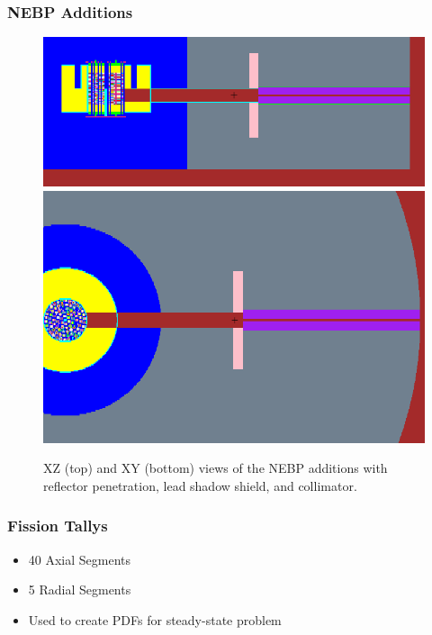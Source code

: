 \documentclass[fleqn]{beamer}
\begin{document}
\begin{frame}
\frametitle{NEBP Additions}

\begin{figure}
\centering
\includegraphics[trim=0 40 0 20, clip, width = .9\textwidth]{mcnp_newxz}\\
\includegraphics[trim=0 120 0 120, clip, width = .9\textwidth]{mcnp_newxy}
\caption{XZ (top) and XY (bottom) views of the NEBP additions with reflector penetration, lead shadow shield, and collimator.}
\end{figure}

\end{frame}


\begin{frame}
\frametitle{Fission Tallys}

\begin{itemize}
\item 40 Axial Segments
\item  5 Radial Segments
\item Used to create PDFs for steady-state problem
\end{itemize}

\end{frame}
\end{document}
